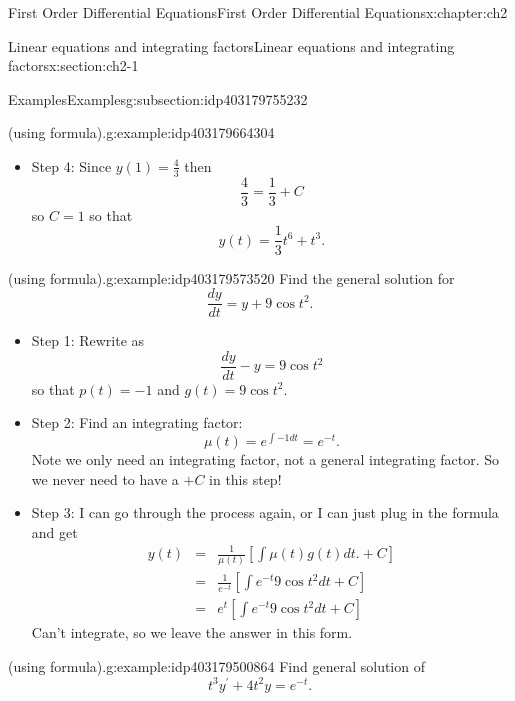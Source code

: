 \documentclass[oneside,10pt,]{book}
\numberwithin{equation}{section}
\numberwithin{equation}{section}
\newcommand{\amp}{&}
\begin{document}
\begin{chapterptx}{First Order Differential Equations}{}{First Order Differential Equations}{}{}{x:chapter:ch2}
\begin{sectionptx}{Linear equations and integrating factors}{}{Linear equations and integrating factors}{}{}{x:section:ch2-1}
\begin{subsectionptx}{Examples}{}{Examples}{}{}{g:subsection:idp403179755232}
\begin{example}{(using formula).}{g:example:idp403179664304}
\begin{itemize}[label=\textbullet]
\begin{align*}
\amp = \amp t^{3}\left[\int\frac{1}{t^{3}}t^{5}dt+C\right]\\
\amp = \amp t^{3}\left[\frac{t^{3}}{3}+C\right]=\frac{1}{3}t^{6}+Ct^{3}.
\end{align*}
%
\item{}Step 4: Since \(y(1)=\frac{4}{3}\) then%
\begin{equation*}
\frac{4}{3}=\frac{1}{3}+C
\end{equation*}
so \(C=1\) so that%
\begin{equation*}
y(t)=\frac{1}{3}t^{6}+t^{3}.
\end{equation*}
%
\end{itemize}
\end{example}
\begin{example}{(using formula).}{g:example:idp403179573520}%
Find the general solution for%
\begin{equation*}
\frac{dy}{dt}=y+9\cos t^{2}.
\end{equation*}
%
%
\begin{itemize}[label=\textbullet]
\item{}Step 1: Rewrite as%
\begin{equation*}
\frac{dy}{dt}-y=9\cos t^{2}
\end{equation*}
so that \(p(t)=-1\) and \(g(t)=9\cos t^{2}\).%
\item{}Step 2: Find an integrating factor:%
\begin{equation*}
\mu(t)=e^{\int-1dt}=e^{-t}.
\end{equation*}
Note we only need an integrating factor, not a general integrating factor. So we never need to have a \(+C\) in this step!%
\item{}Step 3: I can go through the process again, or I can just plug in the formula and get%
\begin{align*}
y(t) \amp = \amp \frac{1}{\mu(t)}\left[\int\mu(t)g(t)dt.+C\right]\\
\amp = \amp \frac{1}{e^{-t}}\left[\int e^{-t}9\cos t^{2}dt+C\right]\\
\amp = \amp e^{t}\left[\int e^{-t}9\cos t^{2}dt+C\right]
\end{align*}
Can't integrate, so we leave the answer in this form.%
\end{itemize}
\end{example}
\begin{example}{(using formula).}{g:example:idp403179500864}%
Find general solution of%
\begin{equation*}
t^{3}y^{\prime}+4t^{2}y=e^{-t}.
\end{equation*}

\end{example}
\end{subsectionptx}
\end{sectionptx}
\end{chapterptx}
\end{document}
